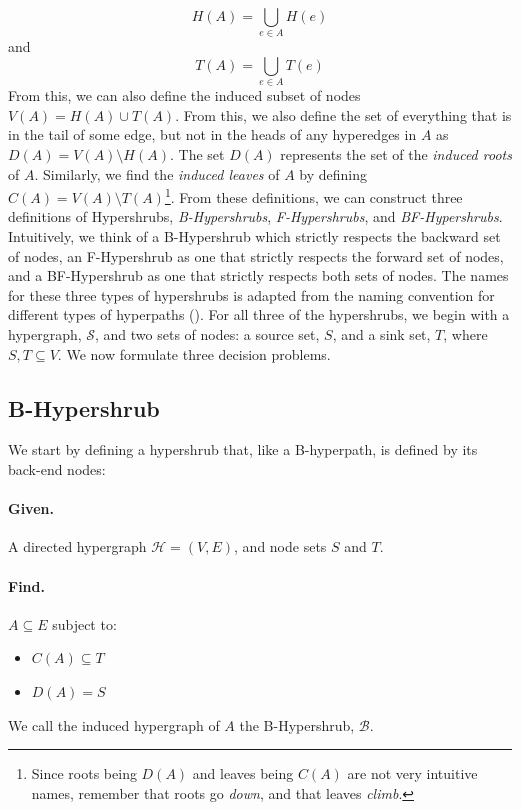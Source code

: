 \documentclass[12pt,twoside]{reedthesis}
\theoremstyle{definition}
\begin{document}
\begin{equation}
  H(A) = \bigcup_{e \in A} H(e)
\end{equation}
and
\begin{equation}
  T(A) = \bigcup_{e \in A} T(e)
\end{equation}
From this, we can also define the induced subset of nodes $V(A) = H(A) \cup T(A)$. From this, we also define the set of everything that is in the tail of some edge, but not in the heads of any hyperedges in $A$ as $D(A) = V(A) \setminus H(A)$. The set $D(A)$ represents the set of the \textit{induced roots} of $A$. Similarly, we find the \textit{induced leaves} of $A$ by defining $C(A) = V(A) \setminus T(A)$\footnote{Since roots being $D(A)$ and leaves being $C(A)$ are not very intuitive names, remember that roots go \textit{down}, and that leaves \textit{climb}.}. From these definitions, we can construct three definitions of Hypershrubs, \textit{B-Hypershrubs}, \textit{F-Hypershrubs}, and \textit{BF-Hypershrubs}. Intuitively, we think of a B-Hypershrub which strictly respects the backward set of nodes, an F-Hypershrub as one that strictly respects the forward set of nodes, and a BF-Hypershrub as one that strictly respects both sets of nodes. The names for these three types of hypershrubs is adapted from the naming convention for different types of hyperpaths (\cite{Gallo1993}). For all three of the hypershrubs, we begin with a hypergraph, $\mathcal{S}$, and two sets of nodes: a source set, $S$, and a sink set, $T$, where $S,T \subseteq V$. We now formulate three decision problems.\par

\subsection{B-Hypershrub}
We start by defining a hypershrub that, like a B-hyperpath, is defined by its back-end nodes:

\bigbreak

\hfill\begin{minipage}{\dimexpr\textwidth-2cm}
\paragraph{Given.}A directed hypergraph $\mathcal{H}=(V,E)$, and node sets $S$ and $T$.
\paragraph{Find.}$A \subseteq E$ subject to:
\begin{itemize}
  \item{$C(A) \subseteq T$}
  \item{$D(A) = S$}
\end{itemize}
\xdef\tpd{\the\prevdepth}
\end{minipage}
\bigbreak
We call the induced hypergraph of $A$ the B-Hypershrub, $\mathcal{B}$.\par
\end{document}
